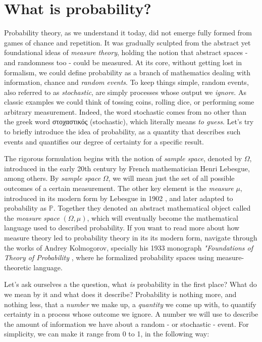 \documentclass{book}
\begin{document}
\section{What is probability?}

Probability theory, as we understand it today, did not emerge fully formed from games of chance and repetition. It was gradually sculpted from the abstract yet foundational ideas of \textit{measure theory}, holding the notion that abstract spaces - and randomness too - could be measured. At its core, without getting lost in formalism, we could define probability as a branch of mathematics dealing with information, chance and \textit{random events}. To keep things simple, random events, also referred to as \textit{stochastic}, are simply processes whose output we \textit{ignore}. As classic examples we could think of tossing coins, rolling dice, or performing some arbitrary measurement. Indeed, the word stochastic comes from no other than the greek word \textgreek{στοχαστικός} (stochastic), which literally means \textit{to guess}. Let's try to briefly introduce the idea of probability, as a quantity that describes such events and quantifies our degree of certainty for a specific result.

\medskip

The rigorous formulation begins with the notion of \textit{sample space}, denoted by $\Omega$, introduced in the early 20th century by French mathematician Henri Lebesgue, among others. By \textit{sample space} $\Omega$, we will mean just the set of all possible outcomes of a certain measurement. The other key element is the \textit{measure} $\mu$, introduced in its modern form by Lebesgue in 1902 \cite{lebesgue1902}, and later adapted to probability as $\mathbb{P}$. Together they denoted an abstract mathematical object called the \textit{measure space} $(\Omega, \mu)$, which will eventually become the mathematical language used to described probability. If you want to read more about how measure theory led to probability theory in its its modern form, navigate through the works of Andrey Kolmogorov, specially his 1933 monograph \textit{"Foundations of Theory of Probability} \cite{kolmogorov1933}, where he formalized probability spaces using measure-theoretic language.

\medskip

Let's ask ourselves a the question, what \textit{is} probability in the first place? What do we mean by it and what does it describe? Probability is nothing more, and nothing less, that a \textit{number} we make up, a \textit{quantity} we come up with, to quantify certainty in a process whose outcome we ignore. A number we will use to describe the amount of information we have about a random - or stochastic - event. For simplicity, we can make it range from 0 to 1, in the following way:
\end{document}
